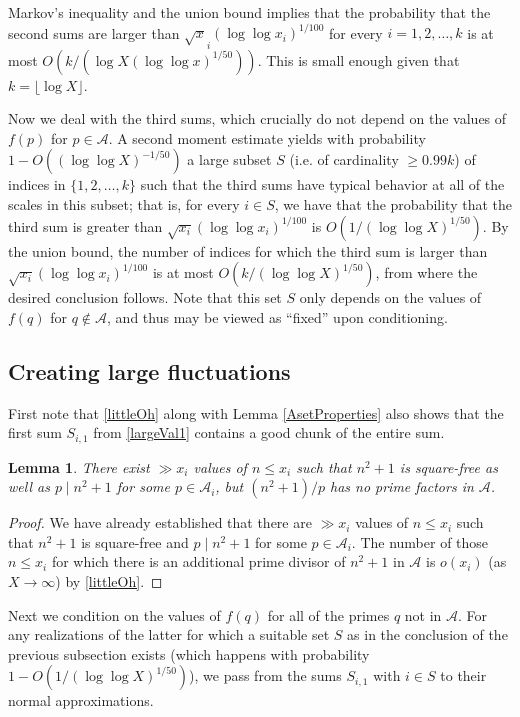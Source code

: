 \documentclass[11pts]{amsart}
\numberwithin{equation}{section}
\newtheorem{lem}{Lemma}[section]
\begin{document}
Markov's inequality and the union bound implies that the probability that the second sums are larger than $\sqrt x_i(\log \log x_i)^{1/100}$ for every $i=1, 2, \ldots, k$ is at most $O(k/(\log X(\log \log x)^{1/50}))$. This is small enough given that $k = \lfloor\log X\rfloor$. 

Now we deal with the third sums, which crucially do not depend on the values of $f(p)$ for $p\in\mathcal A$. A second moment estimate yields with probability $1-O((\log \log X)^{-1/50})$ a large subset $S$ (i.e. of cardinality $\geq 0.99k$) of indices in $\{1, 2, \ldots, k\}$ such that the third sums have typical behavior at all of the scales in this subset; that is, for every $i\in S$, we have that the probability that the third sum is greater than $\sqrt{x_i}(\log \log x_i)^{1/100}$ is $O(1/(\log \log X)^{1/50})$. By the union bound, the number of indices for which the third sum is larger than $\sqrt{x_i}(\log\log x_i)^{1/100}$ is at most $O(k/(\log\log X)^{1/50})$, from where the desired conclusion follows. Note that this set $S$ only depends on the values of $f(q)$ for $q\not\in\mathcal A$, and thus may be viewed as ``fixed'' upon conditioning.

\subsection{Creating large fluctuations} 

First note that \eqref{littleOh} along with Lemma \ref{AsetProperties} also shows that the first sum $S_{i,1}$ from \eqref{largeVal1} contains a good chunk of the entire sum. 

\begin{lem}\label{goodChunk}
    There exist $\gg x_i$ values of $n\leq x_i$ such that $n^2 + 1$ is square-free as well as $p\mid n^2 + 1$ for some $p\in\mathcal A_i$, but $(n^2 + 1)/p$ has no prime factors in $\mathcal A$. 
\end{lem}

\begin{proof}
We have already established that there are $\gg x_i$ values of $n\leq x_i$ such that $n^2 + 1$ is square-free and $p\mid n^2 + 1$ for some $p\in\mathcal A_i$. The number of those $n\leq x_i$ for which there is an additional prime divisor of $n^2 + 1$ in $\mathcal A$ is $o(x_i)$ (as $X\to\infty$) by \eqref{littleOh}. 
\end{proof}

Next we condition on the values of $f(q)$ for all of the primes $q$ not in $\mathcal A$. For any realizations of the latter for which a suitable set $S$ as in the conclusion of the previous subsection exists (which happens with probability $1-O(1/(\log \log X)^{1/50})$), we pass from the sums $S_{i,1}$ with $i\in S$ to their normal approximations.
\end{document}
